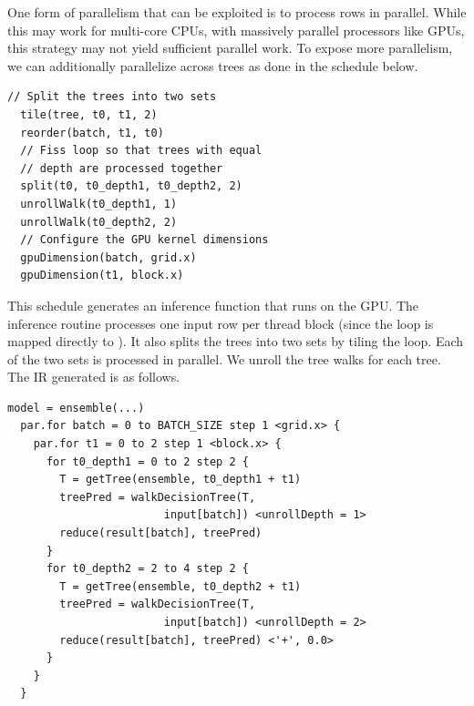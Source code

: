 One form of parallelism that can be exploited is to process rows in 
parallel. 
While this may work for multi-core CPUs, with massively parallel processors like GPUs,
this strategy may not yield sufficient parallel work. To expose more parallelism, 
we can additionally parallelize across trees as done in the schedule below. 
\begin{lstlisting}[style=c++]
  // Split the trees into two sets
  tile(tree, t0, t1, 2)
  reorder(batch, t1, t0)
  // Fiss loop so that trees with equal 
  // depth are processed together
  split(t0, t0_depth1, t0_depth2, 2)
  unrollWalk(t0_depth1, 1)
  unrollWalk(t0_depth2, 2)
  // Configure the GPU kernel dimensions
  gpuDimension(batch, grid.x)
  gpuDimension(t1, block.x)
\end{lstlisting}
This schedule generates an inference function that runs on the GPU. 
The inference routine processes one input row per thread block (since the 
loop is mapped directly to ).
It also splits the trees into two sets by tiling the  loop.
Each of the two sets is processed in parallel. We unroll the tree walks 
for each tree. The IR generated is as follows. 
\begin{lstlisting}[style=c++]
  model = ensemble(...)
  par.for batch = 0 to BATCH_SIZE step 1 <grid.x> {
    par.for t1 = 0 to 2 step 1 <block.x> {
      for t0_depth1 = 0 to 2 step 2 {
        T = getTree(ensemble, t0_depth1 + t1)
        treePred = walkDecisionTree(T, 
                        input[batch]) <unrollDepth = 1>
        reduce(result[batch], treePred)
      }
      for t0_depth2 = 2 to 4 step 2 {
        T = getTree(ensemble, t0_depth2 + t1)
        treePred = walkDecisionTree(T,
                        input[batch]) <unrollDepth = 2>
        reduce(result[batch], treePred) <'+', 0.0>
      }
    }
  }
\end{lstlisting}

